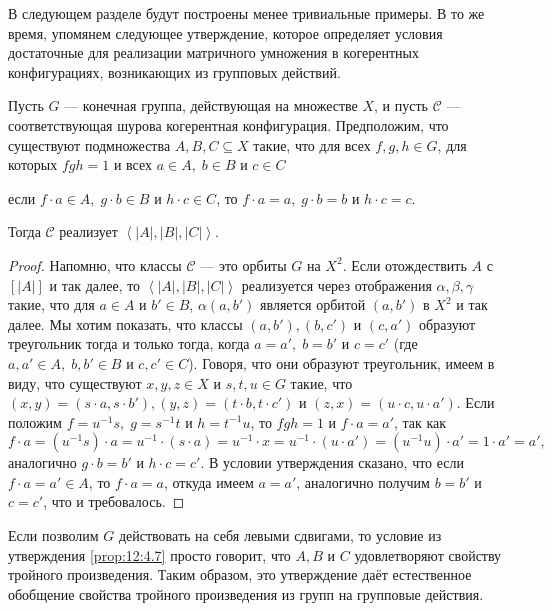 В следующем разделе будут построены менее тривиальные примеры. В то же время, упомянем следующее утверждение, которое определяет условия достаточные для реализации матричного умножения в когерентных конфигурациях, возникающих из групповых действий.

\begin{prop}\label{prop:12:4.7}
	Пусть $G$ --- конечная группа, действующая на множестве $X$, и пусть $\mathscr{C}$ --- соответствующая шурова когерентная конфигурация. Предположим, что существуют подмножества $A,B,C \subseteq X$ такие, что для всех $f,g,h \in G$, для которых $fgh=1$ и всех $a \in A,\; b \in B$ и $c \in C$
	\begin{center}
	  если $f \cdot a \in A,\; g \cdot b \in B$ и $h \cdot c \in C$, то $f \cdot a = a,\; g \cdot b = b$ и $h \cdot c = c$.
	\end{center}    
	Тогда $\mathscr{C}$ реализует $\left\langle |A|, |B|, |C| \right\rangle$.
\end{prop}
\begin{proof}
  Напомню, что классы $\mathscr{C}$ --- это орбиты $G$ на $X^2$. Если отождествить $A$ с $[|A|]$ и так далее, то $\left\langle |A|, |B|, |C| \right\rangle$ реализуется через отображения $\alpha, \beta, \gamma$ такие, что для $a \in A$ и $b' \in B$, $\alpha(a,b')$ является орбитой $(a,b')$ в $X^2$ и так далее. Мы хотим показать, что классы $(a,b'),(b,c')$ и $(c,a')$ образуют треугольник тогда и только тогда, когда $a=a',\; b=b'$ и $c=c'$ (где $a,a' \in A,\; b,b' \in B$ и $c,c' \in C$). Говоря, что они образуют треугольник, имеем в виду, что существуют $x,y,z \in X$ и $s,t,u \in G$ такие, что $(x,y) = (s \cdot a,s \cdot b'), (y,z) = (t \cdot b,t \cdot c')$ и $(z,x) = (u \cdot c,u \cdot a')$. Если положим $f=u^{-1}s,\; g=s^{-1}t$ и $h=t^{-1}u$, то $fgh=1$ и $f \cdot a=a'$, так как 
\[
	f \cdot a = (u^{-1} s) \cdot a = u^{-1} \cdot (s \cdot a) = u^{-1} \cdot x = u^{-1} \cdot (u \cdot a') = (u^{-1} u) \cdot a' = 1 \cdot a' = a',
\] 
аналогично $g \cdot b=b'$ и $h \cdot c=c'$. В условии утверждения сказано, что если $f \cdot a = a'\in A$, то $f \cdot a = a$, откуда имеем $a = a'$, аналогично получим $b=b'$ и $c=c'$, что и требовалось.
\end{proof}

Если позволим $G$ действовать на себя левыми сдвигами, то условие из утверждения \ref{prop:12:4.7} просто говорит, что $A,B$ и $C$ удовлетворяют свойству тройного произведения. Таким образом, это утверждение даёт естественное обобщение свойства тройного произведения из групп на групповые действия.


























